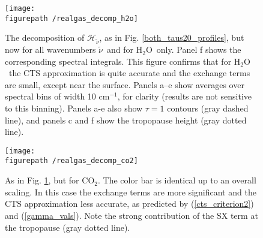 \documentclass{ametsoc}
\newcommand{\eqnref}[1]{(\ref{#1})}
\newcommand{\cminverse}{\ensuremath{\mathrm{cm^{-1}}}}
\newcommand{\cotwo}{\ensuremath{\mathrm{CO_2}}}
\newcommand{\htwo}{\ensuremath{\mathrm{H_2O}}}
\newcommand{\wv}{\ensuremath{\widetilde{\nu}}}
\newcommand{\ch}{\ensuremath{\mathcal{H}}}
\newcommand{\chk}{\ensuremath{\ch_\wv}}
\newcommand{\figurepath}{../plots/}
\begin{document}
\begin{figure}[h]
	\begin{center}
			\texttt{[image: \\figurepath /realgas\_decomp\_h2o]}
		\caption{ The decomposition of \chk, as in Fig. \ref{both_taus20_profiles}, but now for all wavenumbers \wv\ and for \htwo\ only. Panel f shows the corresponding spectral integrals.  This figure confirms that for \htwo\ the CTS approximation is quite accurate and the exchange terms are small, except near the surface.  Panels a--e show averages over spectral bins of width 10 \cminverse, for clarity (results are not sensitive to this binning). Panels a-e also show $\tau=1$ contours (gray dashed line), and panels c and f show the tropopause height (gray dotted line).
		\label{realgas_decomp_h2o}
		}
	\end{center}
\end{figure}

\begin{figure}[h]
	\begin{center}
			\texttt{[image: \\figurepath /realgas\_decomp\_co2]}
		\caption{As in Fig. \ref{realgas_decomp_h2o}, but for \cotwo. The color bar is identical up to an overall scaling. In this case the exchange terms are more significant and the CTS approximation less accurate, as predicted by \eqnref{cts_criterion2} and \eqnref{gamma_vals}. Note the strong contribution of the SX term at the tropopause (gray dotted line). 
				\label{realgas_decomp_co2}
		}
	\end{center}
\end{figure}
\end{document}

